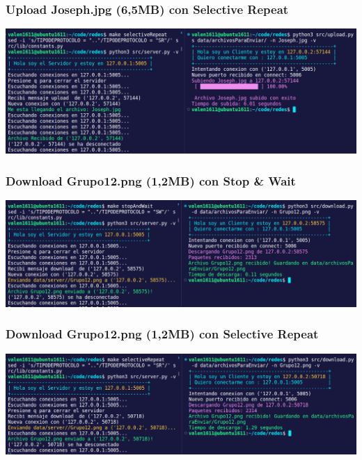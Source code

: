 \documentclass{article}
\begin{document}
\subsubsection{Upload Joseph.jpg (6,5MB) con Selective Repeat}
\begin{center}
\includegraphics[scale=0.35]{UploadJoseph.jpg(6,5MB)conSelectiveRepeat}
\end{center}

\subsubsection{Download Grupo12.png (1,2MB) con Stop \& Wait}
\begin{center}
\includegraphics[scale=0.35]{DownloadGrupo12.png(1,2MB)conStopWait}
\end{center}

\subsubsection{Download Grupo12.png (1,2MB) con Selective Repeat}
\begin{center}
\includegraphics[scale=0.35]{DownloadGrupo12.png(1,2MB)conSelectiveRepeat}
\end{center}
\end{document}
